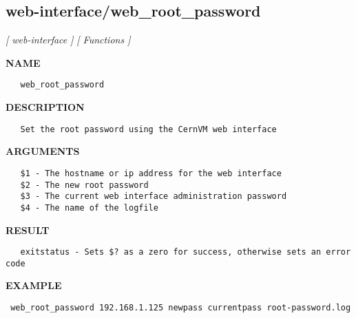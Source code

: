 \subsection{web-interface/web\_root\_password}
\textsl{[ web-interface ]}
\textsl{[ Functions ]}

\label{ch:robo54}
\label{ch:web_interface_web_root_password}
\textbf{NAME}
\begin{verbatim}
   web_root_password
\end{verbatim}
\textbf{DESCRIPTION}
\begin{verbatim}
   Set the root password using the CernVM web interface
\end{verbatim}
\textbf{ARGUMENTS}
\begin{verbatim}
   $1 - The hostname or ip address for the web interface
   $2 - The new root password
   $3 - The current web interface administration password
   $4 - The name of the logfile
\end{verbatim}
\textbf{RESULT}
\begin{verbatim}
   exitstatus - Sets $? as a zero for success, otherwise sets an error code
\end{verbatim}
\textbf{EXAMPLE}
\begin{verbatim}
 web_root_password 192.168.1.125 newpass currentpass root-password.log
\end{verbatim}
\printindex
